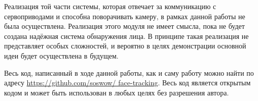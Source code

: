 \documentclass[12pt]{report}
\begin{document}
Реализация той части системы, которая отвечает за коммуникацию с сервоприводами и способна поворачивать камеру, в 
рамках данной работы не была осуществлена. Реализация этого модуля не имеет смысла, пока не будет создана надёжная 
система обнаружения лица. В принципе такая реализация не представляет особых сложностей, и вероятно в целях 
демонстрации основной идеи будет осуществлена в будущем. 

Весь код, написанный в ходе данной работы, как и саму работу можно найти по адресу \url{https://github.com/soswow/
face-tracking}. Весь код является открытым кодом и может быть использован в любых целях без разрешения автора.










\end{document}
